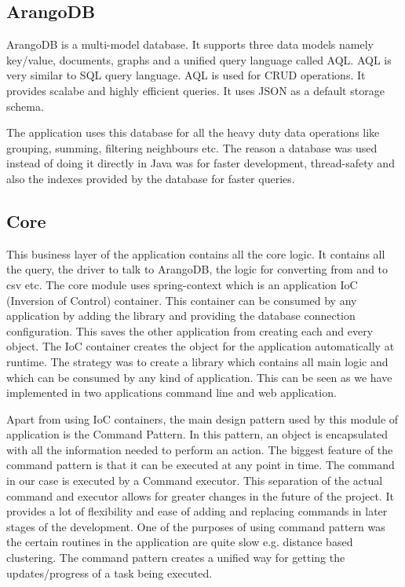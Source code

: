 \subsection{ArangoDB}

ArangoDB is a multi-model database. It supports three data models namely key/value, documents, graphs and a unified query language called AQL. AQL is very similar to SQL query language. AQL is used for CRUD operations. It provides scalabe and highly efficient queries. It uses JSON as a default storage schema. 

The application uses this database for all the heavy duty data operations like grouping, summing, filtering neighbours etc. The reason a database was used instead of doing it directly in Java was for faster development, thread-safety and also the indexes provided by the database for faster queries. 

\subsection{Core}

This business layer of the application contains all the core logic. It contains all the query, the driver to talk to ArangoDB, the logic for converting from and to csv etc. The core module uses spring-context which is an application IoC (Inversion of Control) container. This container can be consumed by any application by adding the library and providing the database connection configuration. This saves the other application from creating each and every object. The IoC container creates the object for the application automatically at runtime. The strategy was to create a library which contains all main logic and which can be consumed by any kind of application. This can be seen as we have implemented in two applications command line and web application.

Apart from using IoC containers, the main design pattern used by this module of application is the Command Pattern\cite{dupire2001command}. In this pattern, an object is encapsulated with all the information needed to perform an action. The biggest feature of the command pattern is that it can be executed at any point in time. The command in our case is executed by a Command executor. This separation of the actual command and executor allows for greater changes in the future of the project. It provides a lot of flexibility and ease of adding and replacing commands in later stages of the development. One of the purposes of using command pattern was the certain routines in the application are quite slow e.g. distance based clustering. The command pattern creates a unified way for getting the updates/progress of a task being executed.

